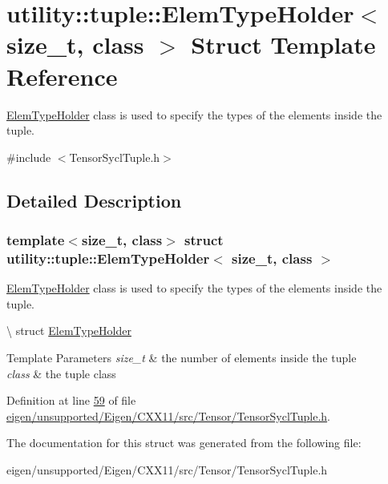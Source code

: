 \hypertarget{structutility_1_1tuple_1_1_elem_type_holder}{}\section{utility\+:\+:tuple\+:\+:Elem\+Type\+Holder$<$ size\+\_\+t, class $>$ Struct Template Reference}
\label{structutility_1_1tuple_1_1_elem_type_holder}


\hyperlink{structutility_1_1tuple_1_1_elem_type_holder}{Elem\+Type\+Holder} class is used to specify the types of the elements inside the tuple.  




{\ttfamily \#include $<$Tensor\+Sycl\+Tuple.\+h$>$}



\subsection{Detailed Description}
\subsubsection*{template$<$size\+\_\+t, class$>$\newline
struct utility\+::tuple\+::\+Elem\+Type\+Holder$<$ size\+\_\+t, class $>$}

\hyperlink{structutility_1_1tuple_1_1_elem_type_holder}{Elem\+Type\+Holder} class is used to specify the types of the elements inside the tuple. 

\textbackslash{} struct \hyperlink{structutility_1_1tuple_1_1_elem_type_holder}{Elem\+Type\+Holder} 
\begin{DoxyTemplParams}{Template Parameters}
{\em size\+\_\+t} & the number of elements inside the tuple \\
\hline
{\em class} & the tuple class \\
\hline
\end{DoxyTemplParams}


Definition at line \hyperlink{eigen_2unsupported_2_eigen_2_c_x_x11_2src_2_tensor_2_tensor_sycl_tuple_8h_source_l00059}{59} of file \hyperlink{eigen_2unsupported_2_eigen_2_c_x_x11_2src_2_tensor_2_tensor_sycl_tuple_8h_source}{eigen/unsupported/\+Eigen/\+C\+X\+X11/src/\+Tensor/\+Tensor\+Sycl\+Tuple.\+h}.



The documentation for this struct was generated from the following file\+:\begin{DoxyCompactItemize}
\item 
eigen/unsupported/\+Eigen/\+C\+X\+X11/src/\+Tensor/\+Tensor\+Sycl\+Tuple.\+h\end{DoxyCompactItemize}
